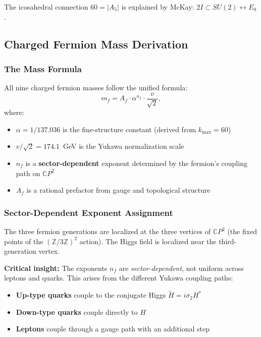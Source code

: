 The icosahedral connection $60 = |A_5|$ is explained by McKay: $2I \subset SU(2) \leftrightarrow E_8$.

\subsection{Charged Fermion Mass Derivation}\label{app:fermion-masses}

\subsubsection{The Mass Formula}

All nine charged fermion masses follow the unified formula:
\begin{equation}\label{eq:mass_formula}
m_f = A_f \cdot \alpha^{n_f} \cdot \frac{v}{\sqrt{2}},
\end{equation}
where:
\begin{itemize}
\item $\alpha = 1/137.036$ is the fine-structure constant (derived from $k_{\max} = 60$)
\item $v/\sqrt{2} = 174.1$~GeV is the Yukawa normalization scale
\item $n_f$ is a \textbf{sector-dependent} exponent determined by the fermion's coupling path on $\mathbb{C}P^2$
\item $A_f$ is a rational prefactor from gauge and topological structure
\end{itemize}

\subsubsection{Sector-Dependent Exponent Assignment}

The three fermion generations are localized at the three vertices of 
$\mathbb{C}P^2$ (the fixed points of the $(\mathbb{Z}/3\mathbb{Z})^2$ action). 
The Higgs field is localized near the third-generation vertex.

\textbf{Critical insight:} The exponents $n_f$ are \emph{sector-dependent}, not uniform 
across leptons and quarks. This arises from the different Yukawa coupling paths:
\begin{itemize}
\item \textbf{Up-type quarks} couple to the conjugate Higgs $\tilde{H} = i\sigma_2 H^*$
\item \textbf{Down-type quarks} couple directly to $H$
\item \textbf{Leptons} couple through a gauge path with an additional step
\end{itemize}

